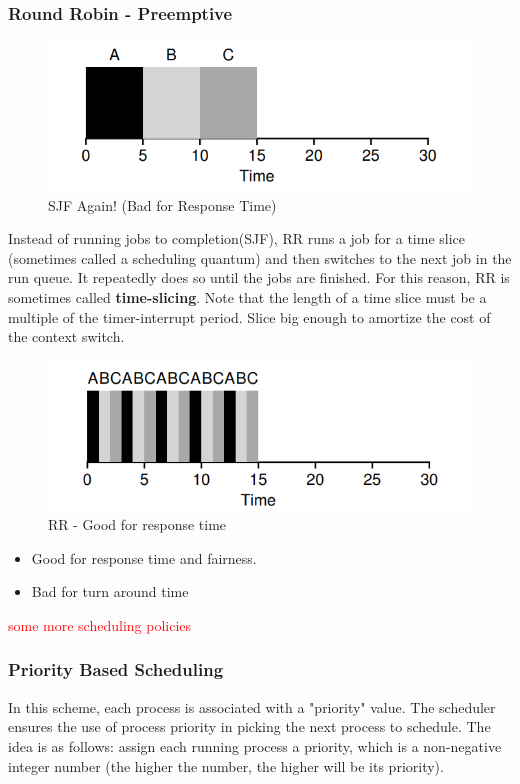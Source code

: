\documentclass{article}
\begin{document}
\subsubsection{Round Robin - Preemptive}
\begin{figure}[H]
        \centering
        \includegraphics[width=0.4\linewidth]{image/sjf3.png}
        \caption{SJF Again! (Bad for Response Time)}
\end{figure}
Instead of running jobs to completion(SJF), RR runs a job for a time slice (sometimes called a scheduling quantum) and then switches to the next job in the run queue. It repeatedly does so until the jobs are finished. For this reason, RR is sometimes called \textbf{time-slicing}. Note that
the length of a time slice must be a multiple of the timer-interrupt period. Slice big enough to
amortize the cost of the context switch.
\begin{figure}[H]
        \centering
        \includegraphics[width=0.6\linewidth]{image/rr.png}
        \caption{RR - Good for response time}
\end{figure}

\begin{itemize}
    \item Good for response time and fairness.
    \item Bad for turn around time
\end{itemize}

\textcolor{red}{some more scheduling policies}
\subsubsection{Priority Based Scheduling}
In this scheme, each process is associated with a "priority" value. The scheduler ensures the use of process priority in picking the next process to schedule. The idea is as follows: assign each running process a priority, which is a non-negative integer number (the higher the number, the higher will be its priority).\\
\end{document}
